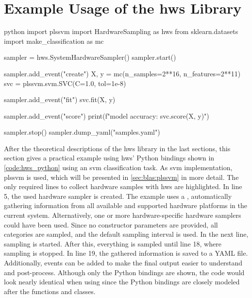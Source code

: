 \section{Example Usage of the hws Library}
\label{sec:hws_example}

\begin{listing}
    \begin{moderncode}[highlightlines={2, 5-6, 18-19}]{python}
import plssvm
import HardwareSampling as hws
from sklearn.datasets import make_classification as mc

sampler = hws.SystemHardwareSampler()
sampler.start()

sampler.add_event("create")
X, y = mc(n_samples=2**16, n_features=2**11)
svc = plssvm.svm.SVC(C=1.0, tol=1e-8)

sampler.add_event("fit")
svc.fit(X, y)

sampler.add_event("score")
print(f"model accuracy: {svc.score(X, y)}")

sampler.stop()
sampler.dump_yaml("samples.yaml")
    \end{moderncode}
    \caption{%
    A code example showing the simplicity of the hws library. 
    With only five required lines of code, it is possible to gather information from the whole system. 
    Additionally, events can be added to make the final output easier to understand and post-process (lines 8, 12, and 15).
    }
    \label{code:hws_python}
\end{listing}

After the theoretical descriptions of the hws library in the last sections, this section gives a practical example using hws' Python bindings shown in \autoref{code:hws_python} using an \gls{svm} classification task. 
As \gls{svm} implementation, \gls{plssvm} is used, which will be presented in \autoref{sec:blas:plssvm} in more detail. 
The only required lines to collect hardware samples with hws are highlighted. 
In line 5, the used hardware sampler is created. 
The example uses a , automatically gathering information from all available and supported hardware platforms in the current system. 
Alternatively, one or more hardware-specific hardware samplers could have been used. 
Since no constructor parameters are provided, all categories are sampled, and the default sampling interval is used. 
In the next line, sampling is started. 
After this, everything is sampled until line 18, where sampling is stopped. 
In line 19, the gathered information is saved to a YAML file. 
Additionally, events can be added to make the final output easier to understand and post-process. 
Although only the Python bindings are shown, the code would look nearly identical when using \cpp since the Python bindings are closely modeled after the \cpp functions and classes. 

